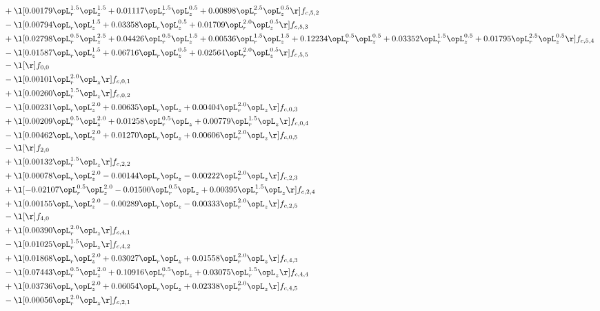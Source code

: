 \begin{alignat}{2}
& + \l[  0.00179 \opL_r^{1.5} \opL_z^{1.5} +  0.01117 \opL_r^{1.5} \opL_z^{0.5} +  0.00898 \opL_r^{2.5} \opL_z^{0.5}  \r] f_{c,5,2} \nonumber \\ 
& - \l[  0.00794 \opL_r \opL_z^{1.5} +  0.03358 \opL_r \opL_z^{0.5} +  0.01709 \opL_r^{2.0} \opL_z^{0.5}  \r] f_{c,5,3} \nonumber \\ 
& + \l[  0.02798 \opL_r^{0.5} \opL_z^{2.5} +  0.04426 \opL_r^{0.5} \opL_z^{1.5} +  0.00536 \opL_r^{1.5} \opL_z^{1.5} +  0.12234 \opL_r^{0.5} \opL_z^{0.5} +  0.03352 \opL_r^{1.5} \opL_z^{0.5} +  0.01795 \opL_r^{2.5} \opL_z^{0.5}  \r] f_{c,5,4} \nonumber \\ 
& - \l[  0.01587 \opL_r \opL_z^{1.5} +  0.06716 \opL_r \opL_z^{0.5} +  0.02564 \opL_r^{2.0} \opL_z^{0.5}  \r] f_{c,5,5} \nonumber \\ 
& - \l[  \r] f_{0,0} \nonumber \\ 
& - \l[  0.00101 \opL_r^{2.0} \opL_z  \r] f_{c,0,1} \nonumber \\ 
& + \l[  0.00260 \opL_r^{1.5} \opL_z  \r] f_{c,0,2} \nonumber \\ 
& - \l[  0.00231 \opL_r \opL_z^{2.0} +  0.00635 \opL_r \opL_z +  0.00404 \opL_r^{2.0} \opL_z  \r] f_{c,0,3} \nonumber \\ 
& + \l[  0.00209 \opL_r^{0.5} \opL_z^{2.0} +  0.01258 \opL_r^{0.5} \opL_z +  0.00779 \opL_r^{1.5} \opL_z  \r] f_{c,0,4} \nonumber \\ 
& - \l[  0.00462 \opL_r \opL_z^{2.0} +  0.01270 \opL_r \opL_z +  0.00606 \opL_r^{2.0} \opL_z  \r] f_{c,0,5} \nonumber \\ 
& - \l[  \r] f_{2,0} \nonumber \\ 
& + \l[  0.00132 \opL_r^{1.5} \opL_z  \r] f_{c,2,2} \nonumber \\ 
& + \l[  0.00078 \opL_r \opL_z^{2.0}   -0.00144 \opL_r \opL_z   -0.00222 \opL_r^{2.0} \opL_z  \r] f_{c,2,3} \nonumber \\ 
& + \l[  -0.02107 \opL_r^{0.5} \opL_z^{2.0}   -0.01500 \opL_r^{0.5} \opL_z +  0.00395 \opL_r^{1.5} \opL_z  \r] f_{c,2,4} \nonumber \\ 
& + \l[  0.00155 \opL_r \opL_z^{2.0}   -0.00289 \opL_r \opL_z   -0.00333 \opL_r^{2.0} \opL_z  \r] f_{c,2,5} \nonumber \\ 
& - \l[  \r] f_{4,0} \nonumber \\ 
& + \l[  0.00390 \opL_r^{2.0} \opL_z  \r] f_{c,4,1} \nonumber \\ 
& - \l[  0.01025 \opL_r^{1.5} \opL_z  \r] f_{c,4,2} \nonumber \\ 
& + \l[  0.01868 \opL_r \opL_z^{2.0} +  0.03027 \opL_r \opL_z +  0.01558 \opL_r^{2.0} \opL_z  \r] f_{c,4,3} \nonumber \\ 
& - \l[  0.07443 \opL_r^{0.5} \opL_z^{2.0} +  0.10916 \opL_r^{0.5} \opL_z +  0.03075 \opL_r^{1.5} \opL_z  \r] f_{c,4,4} \nonumber \\ 
& + \l[  0.03736 \opL_r \opL_z^{2.0} +  0.06054 \opL_r \opL_z +  0.02338 \opL_r^{2.0} \opL_z  \r] f_{c,4,5} \nonumber \\ 
& - \l[  0.00056 \opL_r^{2.0} \opL_z  \r] f_{c,2,1} \nonumber \\ 
\end{alignat} 


